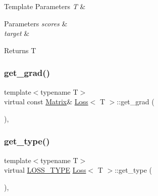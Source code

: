 \begin{DoxyTemplParams}{Template Parameters}
{\em T} & \\
\hline
\end{DoxyTemplParams}

\begin{DoxyParams}{Parameters}
{\em scores} & \\
\hline
{\em target} & \\
\hline
\end{DoxyParams}
\begin{DoxyReturn}{Returns}
T 
\end{DoxyReturn}
\mbox{\label{class_loss_a20cbb31f5e0bb747ba6f8ee6ba25648c}} 
\subsubsection{\texorpdfstring{get\_grad()}{get\_grad()}}
{\footnotesize\ttfamily template$<$typename T$>$ \\
virtual const \mbox{\hyperlink{class_loss_a0cb2ca4ba669a18f628d747a995cd26c}{Matrix}}\& \mbox{\hyperlink{class_loss}{Loss}}$<$ T $>$\+::get\+\_\+grad (\begin{DoxyParamCaption}{ }\end{DoxyParamCaption})\hspace{0.3cm}{\ttfamily [inline]}, {\ttfamily [virtual]}}

\mbox{\label{class_loss_a17a1565bd927d068dbb5f556874e7ae7}} 
\subsubsection{\texorpdfstring{get\_type()}{get\_type()}}
{\footnotesize\ttfamily template$<$typename T$>$ \\
virtual \mbox{\hyperlink{loss_8hpp_a72b6675b9bd68360ebc6e54006d8220f}{L\+O\+S\+S\+\_\+\+T\+Y\+PE}} \mbox{\hyperlink{class_loss}{Loss}}$<$ T $>$\+::get\+\_\+type (\begin{DoxyParamCaption}{ }\end{DoxyParamCaption})\hspace{0.3cm}{\ttfamily [inline]}, {\ttfamily [virtual]}}



